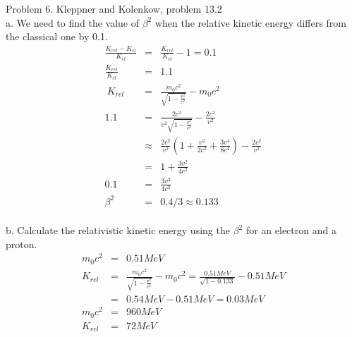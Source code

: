 \documentclass[11pt]{amsart}
\begin{document}
Problem 6. Kleppner and Kolenkow, problem 13.2 \\
a. We need to find the value of $\beta^{2}$ when the relative kinetic energy differs from the classical one by 0.1. \\
\begin{eqnarray*}
\frac{K_{rel}-K_{cl}}{K_{cl}} &=& \frac{K_{rel}}{K_{cl}}-1 = 0.1 \\
\frac{K_{rel}}{K_{cl}} &=& 1.1 \\\
K_{rel} &=& \frac{m_{0}c^{2}}{\sqrt{1-\frac{v^{2}}{c^{2}}}}-m_{0}c^{2} \\
1.1 &=& \frac{2c^{2}}{v^{2}\sqrt{1-\frac{v^{2}}{c^{2}}}}-\frac{2c^{2}}{v^{2}} \\
&\approx& \frac{2c^{2}}{v^{2}}(1+\frac{v^{2}}{2c^{2}}+\frac{3v^{4}}{8c^{4}})-\frac{2c^{2}}{v^{2}} \\
&=& 1+\frac{3v^{2}}{4c^{2}} \\
0.1 &=& \frac{3v^{2}}{4c^{2}} \\
\beta^{2} &=& 0.4/3 \approx 0.133
\end{eqnarray*} \\
b. Calculate the relativistic kinetic energy using the $\beta^{2}$ for an electron and a proton. \\
\begin{eqnarray*}
m_{0}c^{2} &=& 0.51MeV \\
K_{rel} &=& \frac{m_{0}c^{2}}{\sqrt{1-\frac{v^{2}}{c^{2}}}}-m_{0}c^{2} = \frac{0.51MeV}{\sqrt{1-0.133}}-0.51MeV \\
&=& 0.54MeV-0.51MeV = 0.03MeV \\
m_{0}c^{2} &=& 960MeV \\
K_{rel} &=& 72MeV 
\end{eqnarray*} \\
\end{document}
